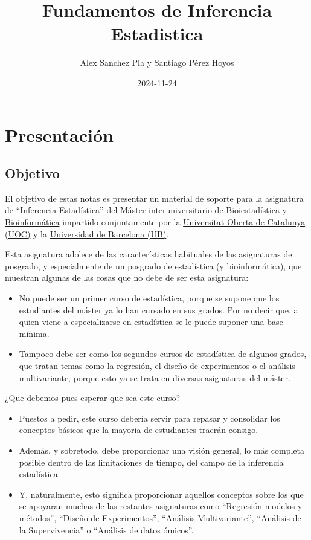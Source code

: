 \documentclass[
]{article}
\title{Fundamentos de Inferencia Estadistica}
\author{Alex Sanchez Pla y Santiago Pérez Hoyos}
\date{2024-11-24}
\providecommand{\tightlist}{%
  \setlength{\itemsep}{0pt}\setlength{\parskip}{0pt}}
\begin{document}
\maketitle

{
\setcounter{tocdepth}{2}
\tableofcontents
}
\section*{Presentación}\label{presentaciuxf3n}

\subsection*{Objetivo}\label{objetivo}

El objetivo de estas notas es presentar un material de soporte para la asignatura de ``Inferencia Estadística'' del \href{https://www.uoc.edu/es/estudios/masters/master-universitario-bioinformatica-bioestadistica}{Máster interuniversitario de Bioiestadística y Bioinformática} impartido conjuntamente por la \href{https://www.uoc.edu}{Universitat Oberta de Catalunya (UOC)} y la \href{https://www.ub.edu}{Universidad de Barcelona (UB)}.

Esta asignatura adolece de las características habituales de las asignaturas de posgrado, y especialmente de un posgrado de estadística (y bioinformática), que muestran algunas de las cosas que no debe de ser esta asignatura:

\begin{itemize}
\tightlist
\item
  No puede ser un primer curso de estadística, porque se supone que los estudiantes del máster ya lo han cursado en sus grados. Por no decir que, a quien viene a especializarse en estadística se le puede suponer una base mínima.
\item
  Tampoco debe ser como los segundos cursos de estadística de algunos grados, que tratan temas como la regresión, el diseño de experimentos o el análisis multivariante, porque esto ya se trata en diversas asignaturas del máster.
\end{itemize}

¿Que debemos pues esperar que sea este curso?

\begin{itemize}
\tightlist
\item
  Puestos a pedir, este curso debería servir para repasar y consolidar los conceptos básicos que la mayoría de estudiantes traerán consigo.
\item
  Además, y sobretodo, debe proporcionar una visión general, lo más completa posible dentro de las limitaciones de tiempo, del campo de la inferencia estadística
\item
  Y, naturalmente, esto significa proporcionar aquellos conceptos sobre los que se apoyaran muchas de las restantes asignaturas como ``Regresión modelos y métodos'', ``Diseño de Experimentos'', ``Análisis Multivariante'', ``Análisis de la Supervivencia'' o ``Análisis de datos ómicos''.
\end{itemize}
\end{document}
